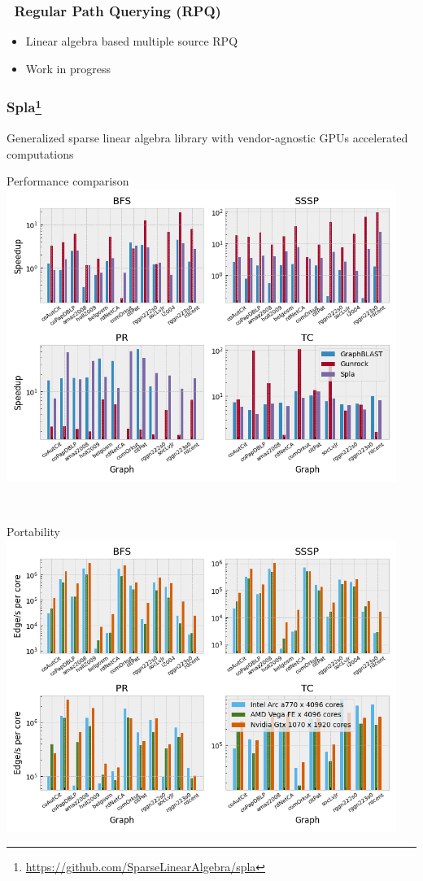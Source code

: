 \documentclass[xcolor=table,aspectratio=169]{beamer}
\begin{document}
\begin{frame}[fragile]
  \frametitle{\faGears \ Regular Path Querying (RPQ)}
  \begin{itemize}
    \item Linear algebra based multiple source RPQ    
    \item Work in progress    
  \end{itemize}
\end{frame}


\begin{frame}[fragile]
  \frametitle{Spla\footnote{\href{https://github.com/SparseLinearAlgebra/spla}{https://github.com/SparseLinearAlgebra/spla}}}
  Generalized sparse linear algebra library with vendor-agnostic GPUs accelerated computations 
  \vfill
  \begin{minipage}{0.48\textwidth}
    \centering
    Performance comparison
    \includegraphics[width = 0.95\textwidth]{pictures/rq1_rel_compact.png}  
  \end{minipage}
  ~
  \begin{minipage}{0.48\textwidth}
    \centering
    Portability
    \includegraphics[width = 0.95\textwidth]{pictures/rq2_cores_compact.png}
  \end{minipage}
  
\end{frame}
\end{document}
